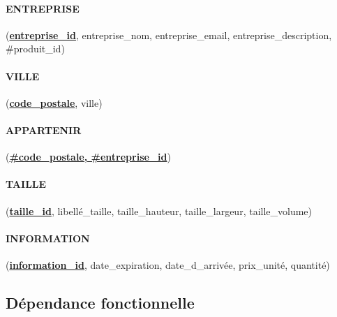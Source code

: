 \paragraph{ENTREPRISE} (\textbf{\underline{entreprise\_id}}, entreprise\_nom, entreprise\_email, entreprise\_description, \#produit\_id)
\paragraph{VILLE} (\textbf{\underline{code\_postale}}, ville)
\paragraph{APPARTENIR} (\textbf{\underline{\#code\_postale, \#entreprise\_id}})
\paragraph{TAILLE} (\textbf{\underline{taille\_id}}, libellé\_taille, taille\_hauteur, taille\_largeur, taille\_volume)
\paragraph{INFORMATION} (\textbf{\underline{information\_id}}, date\_expiration, date\_d\_arrivée, prix\_unité, quantité)

\subsection{Dépendance fonctionnelle}

